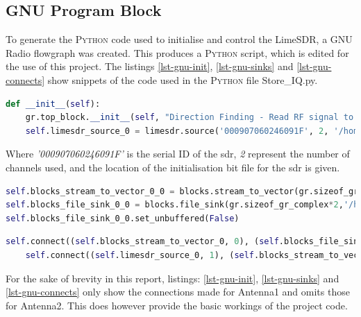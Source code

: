 \documentclass[class=report,11pt,crop=false]{standalone}
\begin{document}
\subsection{GNU Program Block}
To generate the \textsc{Python} code used to initialise and control the LimeSDR, a GNU Radio flowgraph was created. This produces a \textsc{Python} script, which is edited for the use of this project. The listings \ref{lst-gnu-init}, \ref{lst-gnu-sinks} and \ref{lst-gnu-connects} show snippets of the code used in the \textsc{Python} file Store\_IQ.py. 

\begin{lstlisting}[language=Python, caption={GNU Radio Python initialisation and connection made to the LimeSDR}, label={lst-gnu-init}]
def __init__(self):
    gr.top_block.__init__(self, "Direction Finding - Read RF signal to file")
    self.limesdr_source_0 = limesdr.source('000907060246091F', 2, '/home/pi/Desktop/Thesis/Testing/limesdr_init', False)
\end{lstlisting}

Where \emph{'000907060246091F'} is the serial ID of the \gls{sdr}, \emph{2} represent the number of channels used, and the location of the initialisation bit file for the \gls{sdr} is given. 

\begin{lstlisting}[language=Python, caption={GNU Radio Python file sink for complex data stored from antenna 1 is made}, label={lst-gnu-sinks}]
self.blocks_stream_to_vector_0_0 = blocks.stream_to_vector(gr.sizeof_gr_complex*1, 2)
self.blocks_file_sink_0_0 = blocks.file_sink(gr.sizeof_gr_complex*2,'/home/pi/Desktop/Thesis/Testing/a1_data.iq', False)
self.blocks_file_sink_0_0.set_unbuffered(False)
\end{lstlisting}

\begin{lstlisting}[language=Python, caption={GNU Radio Python connection made between LimeSDR antenna port and file sink}, label={lst-gnu-connects}]
    self.connect((self.blocks_stream_to_vector_0, 0), (self.blocks_file_sink_0, 0))
    self.connect((self.limesdr_source_0, 1), (self.blocks_stream_to_vector_0, 0))
\end{lstlisting}

For the sake of brevity in this report, listings: \ref{lst-gnu-init}, \ref{lst-gnu-sinks} and \ref{lst-gnu-connects} only show the connections made for Antenna1 and omits those for Antenna2. This does however provide the basic workings of the project code.
\end{document}
